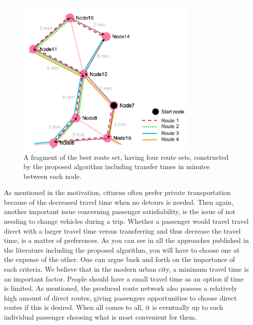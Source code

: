 \begin{figure}[H]
    \begin{center}
    \includegraphics[width=3.5in]{assets/mandl_withTT_utsnitt.png}
    \end{center}
    \caption{A fragment of the best route set, having four route sets, constructed by the proposed algorithm including transfer times in minutes between each node.}
    \label{fig:mandlWithTT} 
\end{figure}

As mentioned in the motivation, citizens often prefer private transportation because of the decreased travel time when no detours is needed. Then again, another important issue concerning passenger satisfiability, is the issue of not needing to change vehicles during a trip. Whether a passenger would travel travel direct with a larger travel time versus transferring and thus decrease the travel time, is a matter of preferences. As you can see in all the approaches published in the literature including the proposed algorithm, you will have to choose one at the expense of the other. One can argue back and forth on the importance of each criteria. We believe that in the modern urban city, a minimum travel time is an important factor. People should have a small travel time as an option if time is limited. As mentioned, the produced route network also possess a relatively high amount of direct routes, giving passengers opportunities to choose direct routes if this is desired. %
When all comes to all, it is eventually up to each individual passenger choosing what is most convenient for them. 







